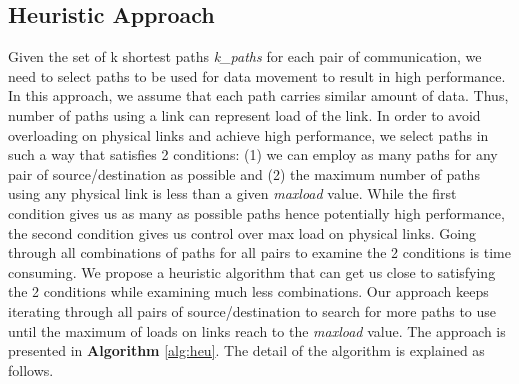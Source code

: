 \subsection{Heuristic Approach}

Given the set of k shortest paths \textit{k\_paths} for each pair of communication, we need to select paths to be used for data movement to result in high performance. In this approach, we assume that each path carries similar amount of data. Thus, number of paths using a link can represent load of the link. In order to avoid overloading on physical links and achieve high performance, we select paths in such a way that satisfies 2 conditions: (1) we can employ as many paths for any pair of source/destination as possible and (2) the maximum number of paths using any physical link is less than a given \textit{maxload} value. While the first condition gives us as many as possible paths hence potentially high performance, the second condition gives us control over max load on physical links. Going through all combinations of paths for all pairs to examine the 2 conditions is time consuming. We propose a heuristic algorithm that can get us close to satisfying the 2 conditions while examining much less combinations. Our approach keeps iterating through all pairs of source/destination to search for more paths to use until the maximum of loads on links reach to the \textit{maxload} value. The approach is presented in \textbf{Algorithm} \ref{alg:heu}. The detail of the algorithm is explained as follows.

